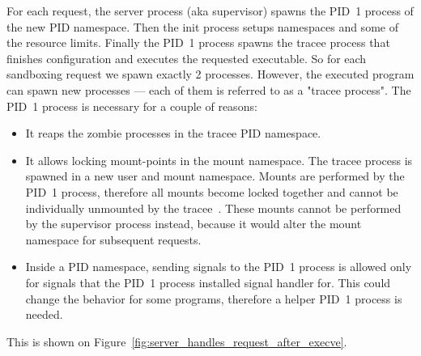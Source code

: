\documentclass[en]{pracamgr}
\begin{document}
For each request, the server process (aka supervisor) spawns the PID~1 process of the new PID namespace. Then the init process setups namespaces and some of the resource limits. Finally the PID~1 process spawns the tracee process that finishes configuration and executes the requested executable. So for each sandboxing request we spawn exactly 2 processes. However, the executed program can spawn new processes --- each of them is referred to as a "tracee process". The PID~1 process is necessary for a couple of reasons:
\begin{itemize}
    \item It reaps the zombie processes in the tracee PID namespace.
    \item It allows locking mount-points in the mount namespace. The tracee process is spawned in a new user and mount namespace. Mounts are performed by the PID~1 process, therefore all mounts become locked together and cannot be individually unmounted by the tracee~\cite{man_mount_namespaces}. These mounts cannot be performed by the supervisor process instead, because it would alter the mount namespace for subsequent requests.
    \item Inside a PID namespace, sending signals to the PID~1 process is allowed only for signals that the PID~1 process installed signal handler for. This could change the behavior for some programs, therefore a helper PID~1 process is needed.
\end{itemize}

This is shown on Figure~\ref{fig:server_handles_request_after_execve}.
\end{document}
